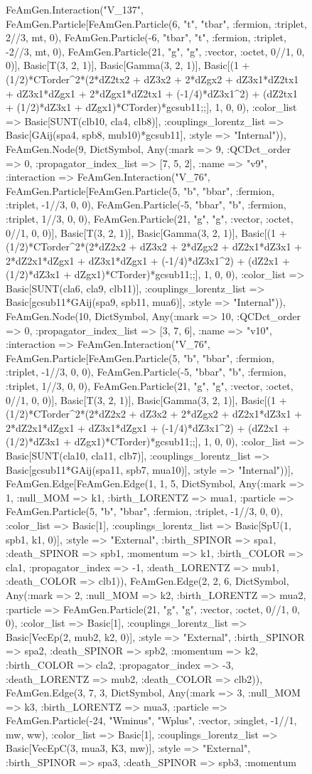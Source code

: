 \documentclass{revtex4}
\begin{document}
\begin{figure}[!htb]
\begin{center}
{FeAmGen.Interaction("V_137", FeAmGen.Particle[FeAmGen.Particle(6, "t", "tbar", :fermion, :triplet, 2//3, mt, 0), FeAmGen.Particle(-6, "tbar", "t", :fermion, :triplet, -2//3, mt, 0), FeAmGen.Particle(21, "g", "g", :vector, :octet, 0//1, 0, 0)], Basic[T(3, 2, 1)], Basic[Gamma(3, 2, 1)], Basic[(1 + (1/2)*CTorder^2*(2*dZ2tx2 + dZ3x2 + 2*dZgx2 + dZ3x1*dZ2tx1 + dZ3x1*dZgx1 + 2*dZgx1*dZ2tx1 + (-1/4)*dZ3x1^2) + (dZ2tx1 + (1/2)*dZ3x1 + dZgx1)*CTorder)*gcsub11;;], 1, 0, 0), :color_list => Basic[SUNT(clb10, cla4, clb8)], :couplings_lorentz_list => Basic[GAij(spa4, spb8, mub10)*gcsub11], :style => "Internal")), FeAmGen.Node(9, Dict{Symbol, Any}(:mark => 9, :QCDct_order => 0, :propagator_index_list => [7, 5, 2], :name => "v9", :interaction => FeAmGen.Interaction("V_76", FeAmGen.Particle[FeAmGen.Particle(5, "b", "bbar", :fermion, :triplet, -1//3, 0, 0), FeAmGen.Particle(-5, "bbar", "b", :fermion, :triplet, 1//3, 0, 0), FeAmGen.Particle(21, "g", "g", :vector, :octet, 0//1, 0, 0)], Basic[T(3, 2, 1)], Basic[Gamma(3, 2, 1)], Basic[(1 + (1/2)*CTorder^2*(2*dZ2x2 + dZ3x2 + 2*dZgx2 + dZ2x1*dZ3x1 + 2*dZ2x1*dZgx1 + dZ3x1*dZgx1 + (-1/4)*dZ3x1^2) + (dZ2x1 + (1/2)*dZ3x1 + dZgx1)*CTorder)*gcsub11;;], 1, 0, 0), :color_list => Basic[SUNT(cla6, cla9, clb11)], :couplings_lorentz_list => Basic[gcsub11*GAij(spa9, spb11, mua6)], :style => "Internal")), FeAmGen.Node(10, Dict{Symbol, Any}(:mark => 10, :QCDct_order => 0, :propagator_index_list => [3, 7, 6], :name => "v10", :interaction => FeAmGen.Interaction("V_76", FeAmGen.Particle[FeAmGen.Particle(5, "b", "bbar", :fermion, :triplet, -1//3, 0, 0), FeAmGen.Particle(-5, "bbar", "b", :fermion, :triplet, 1//3, 0, 0), FeAmGen.Particle(21, "g", "g", :vector, :octet, 0//1, 0, 0)], Basic[T(3, 2, 1)], Basic[Gamma(3, 2, 1)], Basic[(1 + (1/2)*CTorder^2*(2*dZ2x2 + dZ3x2 + 2*dZgx2 + dZ2x1*dZ3x1 + 2*dZ2x1*dZgx1 + dZ3x1*dZgx1 + (-1/4)*dZ3x1^2) + (dZ2x1 + (1/2)*dZ3x1 + dZgx1)*CTorder)*gcsub11;;], 1, 0, 0), :color_list => Basic[SUNT(cla10, cla11, clb7)], :couplings_lorentz_list => Basic[gcsub11*GAij(spa11, spb7, mua10)], :style => "Internal"))], FeAmGen.Edge[FeAmGen.Edge(1, 1, 5, Dict{Symbol, Any}(:mark => 1, :null_MOM => k1, :birth_LORENTZ => mua1, :particle => FeAmGen.Particle(5, "b", "bbar", :fermion, :triplet, -1//3, 0, 0), :color_list => Basic[1], :couplings_lorentz_list => Basic[SpU(1, spb1, k1, 0)], :style => "External", :birth_SPINOR => spa1, :death_SPINOR => spb1, :momentum => k1, :birth_COLOR => cla1, :propagator_index => -1, :death_LORENTZ => mub1, :death_COLOR => clb1)), FeAmGen.Edge(2, 2, 6, Dict{Symbol, Any}(:mark => 2, :null_MOM => k2, :birth_LORENTZ => mua2, :particle => FeAmGen.Particle(21, "g", "g", :vector, :octet, 0//1, 0, 0), :color_list => Basic[1], :couplings_lorentz_list => Basic[VecEp(2, mub2, k2, 0)], :style => "External", :birth_SPINOR => spa2, :death_SPINOR => spb2, :momentum => k2, :birth_COLOR => cla2, :propagator_index => -3, :death_LORENTZ => mub2, :death_COLOR => clb2)), FeAmGen.Edge(3, 7, 3, Dict{Symbol, Any}(:mark => 3, :null_MOM => k3, :birth_LORENTZ => mua3, :particle => FeAmGen.Particle(-24, "Wminus", "Wplus", :vector, :singlet, -1//1, mw, ww), :color_list => Basic[1], :couplings_lorentz_list => Basic[VecEpC(3, mua3, K3, mw)], :style => "External", :birth_SPINOR => spa3, :death_SPINOR => spb3, :momentum }
\end{center}
\end{figure}
\end{document}
